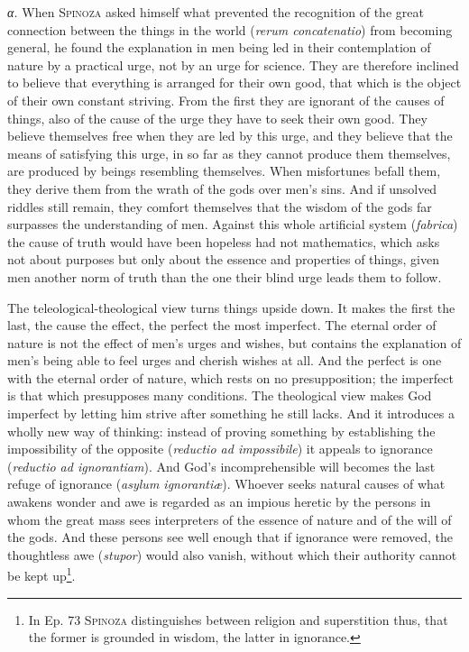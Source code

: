 \documentclass[12pt]{article}
\begin{document}
\textit{α.} When \textsc{Spinoza} asked himself what prevented the recognition of the
great connection between the things in the world (\textit{rerum concatenatio}) from
becoming general, he found the explanation in men being led in their contemplation of
nature by a practical urge, not by an urge for science. They are therefore inclined to
believe that everything is arranged for their own good, that which is the object of their
own constant striving. From the first they are ignorant of the causes of things, also of
the cause of the urge they have to seek their own good. They believe themselves free when
they are led by this urge, and they believe that the means of satisfying this urge, in so
far as they cannot produce them themselves, are produced by beings resembling themselves.
When misfortunes befall them, they derive them from the wrath of the gods over men's sins.
And if unsolved riddles still remain, they comfort themselves that the wisdom of the gods
far surpasses the understanding of men. Against this whole artificial system
(\textit{fabrica}) the cause of truth would have been hopeless had not mathematics, which
asks not about purposes but only about the essence and properties of things, given men
another norm of truth than the one their blind urge leads them to follow.

The teleological-theological view turns things upside down. It makes the first the last,
the cause the effect, the perfect the most imperfect. The eternal order of nature is not
the effect of men's urges and wishes, but contains the explanation of men's being able to
feel urges and cherish wishes at all. And the perfect is one with the eternal order of
nature, which rests on no presupposition; the imperfect is that which presupposes many
conditions. The theological view makes God imperfect by letting him strive after something
he still lacks. And it introduces a wholly new way of thinking: instead of proving
something by establishing the impossibility of the opposite (\textit{reductio ad
impossibile}) it appeals to ignorance (\textit{reductio ad ignorantiam}). And God's
incomprehensible will becomes the last refuge of ignorance (\textit{asylum
ignorantiæ}). Whoever seeks natural causes of what awakens wonder and awe is regarded as
an impious heretic by the persons in whom the great mass sees interpreters of the essence
of nature and of the will of the gods. And these persons see well enough that if ignorance
were removed, the thoughtless awe (\textit{stupor}) would also vanish, without which their
authority cannot be kept up\footnote{In Ep. 73 \textsc{Spinoza} distinguishes between
religion and superstition thus, that the former is grounded in wisdom, the latter in
ignorance.}.
\end{document}
